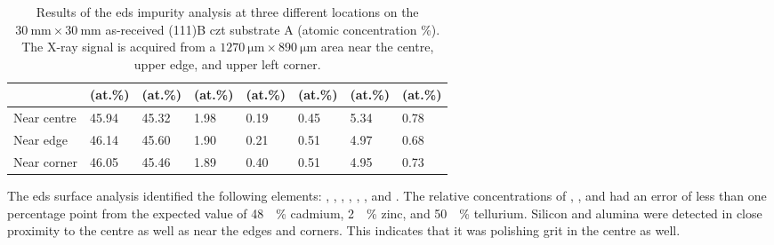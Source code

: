 \begin{table}[htbp]
    \centering
    \caption[\Ac{eds} impurity analysis of the as-received substrate A.]{Results of the \ac{eds} impurity analysis at three different locations on the $\SI{30}{\milli\metre}\times\SI{30}{\milli\metre}$ as-received (111)B \ac{czt} substrate A (atomic concentration \%). The X-ray signal is acquired from a $\SI{1270}{\micro\metre}\times\SI{890}{\micro\metre}$ area near the centre, upper edge, and upper left corner.}\label{tab:subAa_eds_analysis}
    \begin{tabu} to 1.0\textwidth { X[1.85,r] X[1.125,c] X[1.125,c] X[1.125,c] X[1.125,c] X[1.125,c] X[1.125,c] X[1.125,c] }
    \hline
         & \textbf{} (at.\%) & \textbf{} (at.\%) & \textbf{} (at.\%) & \textbf{ } (at.\%) & \textbf{} (at.\%) & \textbf{} (at.\%) & \textbf{} (at.\%) \\ %
        \hline
        Near centre  & \SI{45.94}{} & \SI{45.32}{} & \SI{1.98}{} & \SI{0.19}{} & \SI{0.45}{} & \SI{5.34}{} & \SI{0.78}{} \\ %
        Near edge & \SI{46.14}{} & \SI{45.60}{} & \SI{1.90}{} & \SI{0.21}{} & \SI{0.51}{} & \SI{4.97}{} & \SI{0.68}{} \\ %
        Near corner & \SI{46.05}{} & \SI{45.46}{} & \SI{1.89}{} & \SI{0.40}{} & \SI{0.51}{} & \SI{4.95}{} & \SI{0.73}{} \\ %
         \hline
    \end{tabu}
\end{table}

The \ac{eds} surface analysis identified the following elements: , , , , , , and . The relative concentrations of , , and  had an error of less than one percentage point from the expected value of \SI{48}{\atomic\percent} cadmium, \SI{2}{\atomic\percent} zinc, and \SI{50}{\atomic\percent} tellurium. Silicon and alumina were detected in close proximity to the centre as well as near the edges and corners. This indicates that it was polishing grit in the centre as well. %
